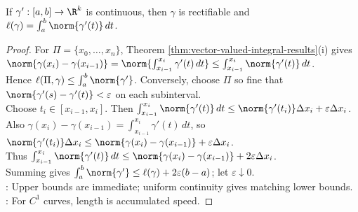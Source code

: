 \begin{theorem} \label{thm:continuously-differentiable-curves-rectifiable} \\
If $\gamma':[a,b]\to\R^k$ is continuous, then $\gamma$ is rectifiable and $\ell(\gamma)=\int_a^b\norm{\gamma'(t)}\,dt$.
\begin{proof}
For $\Pi=\{x_0,\ldots,x_n\}$, Theorem \ref{thm:vector-valued-integral-results}(i) gives $\norm{\gamma(x_i)-\gamma(x_{i-1})} =\norm{\int_{x_{i-1}}^{x_i}\gamma'(t)\,dt} \leq\int_{x_{i-1}}^{x_i}\norm{\gamma'(t)}\,dt$.\\
Hence $\ell(\Pi,\gamma)\leq\int_a^b\norm{\gamma'}$. Conversely, choose $\Pi$ so fine that $\norm{\gamma'(s)-\gamma'(t)}<\varepsilon$ on each subinterval.\\
Choose $t_i\in[x_{i-1},x_i]$. Then $\int_{x_{i-1}}^{x_i}\norm{\gamma'(t)}\,dt \leq \norm{\gamma'(t_i)}\Delta x_i+\varepsilon\Delta x_i$.\\
Also $\gamma(x_i)-\gamma(x_{i-1})=\int_{x_{i-1}}^{x_i}\gamma'(t)\,dt$, so $\norm{\gamma'(t_i)}\Delta x_i \leq \norm{\gamma(x_i)-\gamma(x_{i-1})}+\varepsilon\Delta x_i$.\\
Thus $\int_{x_{i-1}}^{x_i}\norm{\gamma'(t)}\,dt \leq \norm{\gamma(x_i)-\gamma(x_{i-1})}+2\varepsilon\Delta x_i$.\\
Summing gives $\int_a^b\norm{\gamma'}\leq\ell(\gamma)+2\varepsilon(b-a)$; let $\varepsilon\downarrow0$.\\
: Upper bounds are immediate; uniform continuity gives matching lower bounds.\\
: For $C^1$ curves, length is accumulated speed.
\end{proof}
\end{theorem}

